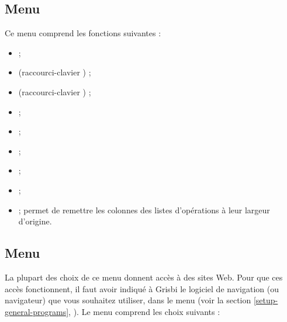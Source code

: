 \subsection{Menu \label{home-menus-display}}

Ce menu comprend les fonctions suivantes : 

\begin{itemize}
	 \item {} ; 
	 \item {} (raccourci-clavier ) ;
	 \item {} (raccourci-clavier ) ;
	 \item {} ;
	 \item {} ;
	 \item {} ;
	 \item {} ;
	 \item {} ;
	 \item {} ; permet de remettre les colonnes des listes d'opérations à leur largeur d'origine.
\end{itemize}


\subsection{Menu \label{home-menus-help}}

La plupart des choix de ce menu donnent accès à des sites Web. Pour que ces accès fonctionnent, il faut avoir indiqué à Grisbi le logiciel de navigation (ou navigateur) que vous souhaitez utiliser, dans le menu  (voir la section \vref{setup-general-programs}, ). Le menu  comprend les choix suivants :

